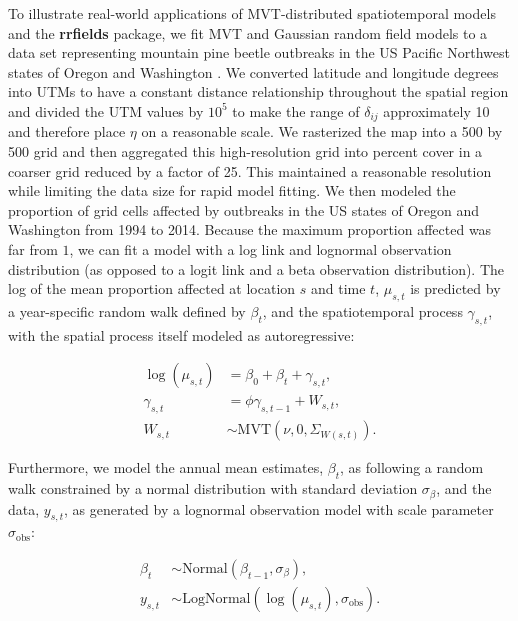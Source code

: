 \documentclass[12pt,english]{article}
\begin{document}
\begin{spacing}{1.3}
To illustrate real-world applications of MVT-distributed
spatiotemporal models and the \textbf{rrfields} package,
we fit MVT and Gaussian random field models
to a data set representing
mountain pine beetle outbreaks in the
US Pacific Northwest states of Oregon and Washington \citep{usdaforestservice2017}.
We converted latitude and longitude degrees into UTMs to have a constant
distance relationship throughout the spatial region and divided the UTM values
by $10^5$ to make the range of $\delta_{ij}$ approximately 10 and therefore
place $\eta$ on a reasonable scale.
We rasterized the map into a 500 by 500 grid
and then aggregated this high-resolution grid
into percent cover in a coarser grid reduced by a factor of 25.
This maintained a reasonable resolution
while limiting the data size for rapid model fitting.
We then modeled the
proportion of grid cells affected by outbreaks
in the US states of Oregon and Washington from 1994 to 2014.
Because the maximum proportion affected was far from $1$, we
can fit a model with a log link and lognormal observation distribution
(as opposed to a logit link and a beta observation distribution).
The log of the mean proportion affected at location $s$ and time $t$, $\mu_{s,t}$
is predicted by a year-specific random walk defined by $\beta_t$,
and the spatiotemporal process $\gamma_{s,t}$,
with the spatial process itself modeled as autoregressive:

\begin{align}
  \log(\mu_{s,t}) &= \beta_0 + \beta_t + \gamma_{s,t},\\
  \gamma_{s,t} &= \phi \gamma_{s,t-1} + W_{s,t},\\ \label{eq:beetle-mu}
  W_{s,t} &\sim \mathrm{MVT}\left(\nu, 0, \Sigma_{W(s,t)}\right).
\end{align}

\noindent Furthermore, we model the annual
mean estimates, $\beta_t$, as following a random walk
constrained by a normal distribution with standard deviation $\sigma_{\beta}$,
and the data, $y_{s,t}$, as generated by a lognormal observation model
with scale parameter $\sigma_{\mathrm{obs}}$:

 \begin{align}
 \beta_t &\sim \mathrm{Normal}\left( \beta_{t-1}, \sigma_{\beta} \right),\\
  y_{s,t} &\sim \mathrm{LogNormal} \left(  \log(\mu_{s,t}), \sigma_{\mathrm{obs}} \right).
 \end{align}


\end{spacing}
\end{document}
